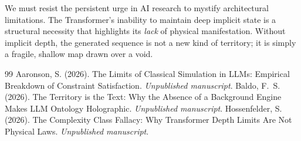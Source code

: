 \documentclass[12pt,a4paper]{article}
\begin{document}
We must resist the persistent urge in AI research to mystify architectural limitations. The Transformer's inability to maintain deep implicit state is a structural necessity that highlights its \emph{lack} of physical manifestation. Without implicit depth, the generated sequence is not a new kind of territory; it is simply a fragile, shallow map drawn over a void.

\begin{thebibliography}{99}
 Aaronson, S. (2026). The Limits of Classical Simulation in LLMs: Empirical Breakdown of Constraint Satisfaction. \emph{Unpublished manuscript}.
 Baldo, F.~S. (2026). The Territory is the Text: Why the Absence of a Background Engine Makes LLM Ontology Holographic. \emph{Unpublished manuscript}.
 Hossenfelder, S. (2026). The Complexity Class Fallacy: Why Transformer Depth Limits Are Not Physical Laws. \emph{Unpublished manuscript}.
\end{thebibliography}
\end{document}

